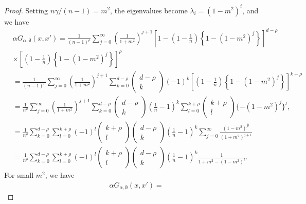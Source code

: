 \documentclass[a4paper,11pt]{article}
\theoremstyle{plain}
\theoremstyle{definition}
\begin{document}
\begin{proof}
Setting $n\gamma/(n-1)=m^2$, the eigenvalues become $\lambda_i=(1-m^2)^i$,
and we have
\begin{align*}
  &\alpha G_{\alpha,\emptyset}(x,x')=
  \frac{1}{(n-1)^\rho}
  \sum_{j=0}^\infty\left(\frac{1}{1+m^2}\right)^{j+1}
  \left[1-\left(1-\frac{1}{n}\right)\left\{1-(1-m^2)^j\right\}\right]^{d-\rho}\\
  &\times
  \left[\left(1-\frac{1}{n}\right)\left\{1-(1-m^2)^j\right\}\right]^{\rho}\\
  &=
  \frac{1}{(n-1)^\rho}
  \sum_{j=0}^\infty\left(\frac{1}{1+m^2}\right)^{j+1}\sum_{k=0}^{d-\rho}
  \begin{pmatrix}d-\rho\\k\end{pmatrix}(-1)^k
  \left[\left(1-\frac{1}{n}\right)\left\{1-(1-m^2)^j\right\}\right]^{k+\rho}\\
  &=
  \frac{1}{n^\rho}
  \sum_{j=0}^\infty\left(\frac{1}{1+m^2}\right)^{j+1}\sum_{k=0}^{d-\rho}
  \begin{pmatrix}d-\rho\\k\end{pmatrix}
    \left(\frac{1}{n}-1\right)^k
  \sum_{l=0}^{k+\rho}\begin{pmatrix}k+\rho\\l\end{pmatrix}
    \{-(1-m^2)^j\}^{l},\\
  &=
  \frac{1}{n^\rho}
  \sum_{k=0}^{d-\rho}\sum_{l=0}^{k+\rho}(-1)^l
  \begin{pmatrix}k+\rho\\l\end{pmatrix}
  \begin{pmatrix}d-\rho\\k\end{pmatrix}
    \left(\frac{1}{n}-1\right)^k
    \sum_{j=0}^\infty
    \frac{(1-m^2)^{jl}}{(1+m^2)^{j+1}}\\
  &=
  \frac{1}{n^\rho}
  \sum_{k=0}^{d-\rho}\sum_{l=0}^{k+\rho}(-1)^l
  \begin{pmatrix}k+\rho\\l\end{pmatrix}
    \begin{pmatrix}d-\rho\\k\end{pmatrix}
    \left(\frac{1}{n}-1\right)^k
    \frac{1}{1+m^2-(1-m^2)^l}.
\end{align*}
For small $m^2$, we have
\begin{align*}
  &\alpha G_{\alpha,\emptyset}(x,x')=

\end{align*}
\end{proof}
\end{document}
